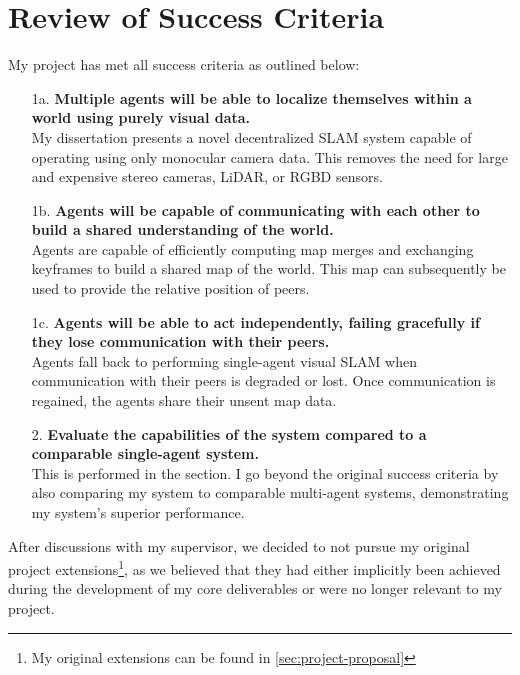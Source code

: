 

\label{sec:4}

\section{Review of Success Criteria}
\label{sec:review-of-success-criteria}
My project has met all success criteria as outlined below:\noparskip
\smallbreak
{
    \begin{enumerate}[font=\bfseries]
        \item[1a.]\textbf{Multiple agents will be able to localize themselves within a world using purely visual data.} \\
        My dissertation presents a novel decentralized SLAM system capable of operating using only monocular camera data. This removes the need for large and expensive stereo cameras, LiDAR, or RGBD sensors.

        \item[1b.]\textbf{Agents will be capable of communicating with each other to build a shared understanding of the world.} \\
        Agents are capable of efficiently computing map merges and exchanging keyframes to build a shared map of the world. This map can subsequently be used to provide the relative position of peers.

        \item[1c.]\textbf{Agents will be able to act independently, failing gracefully if they lose communication with their peers.} \\
        Agents fall back to performing single-agent visual SLAM when communication with their peers is degraded or lost. Once communication is regained, the agents share their unsent map data.

        \item[2.]\textbf{Evaluate the capabilities of the system compared to a comparable single-agent system.} \\
        This is performed in the  section. I go beyond the original success criteria by also comparing my system to comparable multi-agent systems, demonstrating my system's superior performance.

    \end{enumerate}
}
After discussions with my supervisor, we decided to not pursue my original project extensions\footnote[1]{My original extensions can be found in \autoref{sec:project-proposal}}, as we believed that they had either implicitly been achieved during the development of my core deliverables or were no longer relevant to my project.

